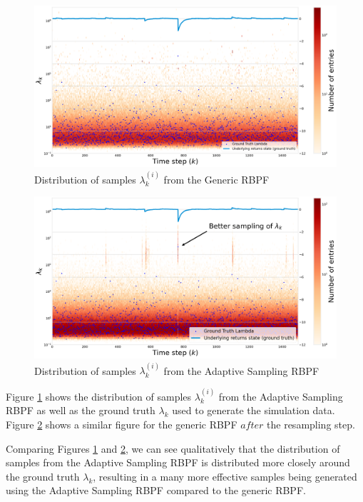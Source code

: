 \documentclass[../main.tex]{subfiles}
\begin{document}
\begin{figure}[h!]
	\centering
	\includegraphics[width=15.0cm]{../plots/4__1__1__lambdas_generic.png}
	\caption{Distribution of samples $\lambda_k^{(i)}$ from the Generic RBPF}
	\label{fig:4__1__1__lambdas_generic}
\end{figure}

\begin{figure}[h!]
	\centering
	\includegraphics[width=15.0cm]{../plots/4__1__1__lambdas_adaptive_sampling.png}
	\caption{Distribution of samples $\lambda_k^{(i)}$ from the Adaptive Sampling RBPF}
	\label{fig:4__1__1__lambdas_adaptive_sampling}
\end{figure}

Figure \ref{fig:4__1__1__lambdas_generic} shows the distribution of samples $\lambda_k^{(i)}$ from the Adaptive Sampling RBPF as well as the ground truth $\lambda_k$ used to generate the simulation data. 
Figure \ref{fig:4__1__1__lambdas_adaptive_sampling} shows a similar figure for the generic RBPF $\textit{after}$ the resampling step. 

Comparing Figures \ref{fig:4__1__1__lambdas_generic} and \ref{fig:4__1__1__lambdas_adaptive_sampling}, we can see qualitatively that the distribution of samples from the Adaptive Sampling RBPF is distributed more closely around the ground truth $\lambda_k$, resulting in a many more effective samples being generated using the Adaptive Sampling RBPF compared to the generic RBPF.
\end{document}

